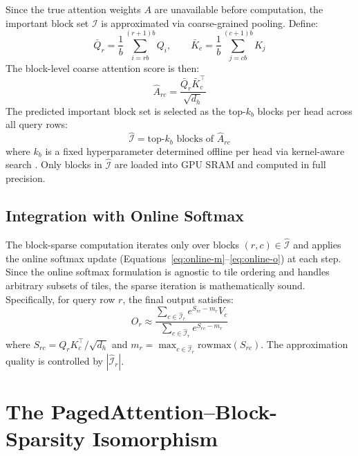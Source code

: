 \documentclass{article}
\begin{document}
Since the true attention weights $A$ are unavailable before computation,
the important block set $\mathcal{I}$ is approximated via coarse-grained
pooling. Define:
%
\begin{equation}
  \bar{Q}_r = \frac{1}{b} \sum_{i=rb}^{(r+1)b} Q_i,
  \qquad
  \bar{K}_c = \frac{1}{b} \sum_{j=cb}^{(c+1)b} K_j
  \label{eq:mean-pool}
\end{equation}
%
The block-level coarse attention score is then:
%
\begin{equation}
  \hat{A}_{rc} = \frac{\bar{Q}_r \bar{K}_c^\top}{\sqrt{d_h}}
  \label{eq:coarse-score}
\end{equation}
%
The predicted important block set is selected as the top-$k_b$ blocks per
head across all query rows:
%
\begin{equation}
  \hat{\mathcal{I}} = \text{top-}k_b \text{ blocks of } \hat{A}_{rc}
  \label{eq:topk}
\end{equation}
%
where $k_b$ is a fixed hyperparameter determined offline per head via
kernel-aware search \cite{minference}. Only blocks in $\hat{\mathcal{I}}$
are loaded into GPU SRAM and computed in full precision.

\subsection{Integration with Online Softmax}

The block-sparse computation iterates only over blocks
$(r, c) \in \hat{\mathcal{I}}$ and applies the online softmax update
(Equations~\ref{eq:online-m}--\ref{eq:online-o}) at each step. Since the
online softmax formulation is agnostic to tile ordering and handles
arbitrary subsets of tiles, the sparse iteration is mathematically sound.
Specifically, for query row $r$, the final output satisfies:
%
\begin{equation}
  O_r \approx
  \frac{
    \sum_{c \in \hat{\mathcal{I}}_r} e^{S_{rc} - m_r} V_c
  }{
    \sum_{c \in \hat{\mathcal{I}}_r} e^{S_{rc} - m_r}
  }
  \label{eq:sparse-output}
\end{equation}
%
where $S_{rc} = Q_r K_c^\top / \sqrt{d_h}$ and
$m_r = \max_{c \in \hat{\mathcal{I}}_r} \text{rowmax}(S_{rc})$.
The approximation quality is controlled by $|\hat{\mathcal{I}}_r|$.

\section{The PagedAttention--Block-Sparsity Isomorphism}
\label{sec:isomorphism}
\end{document}
